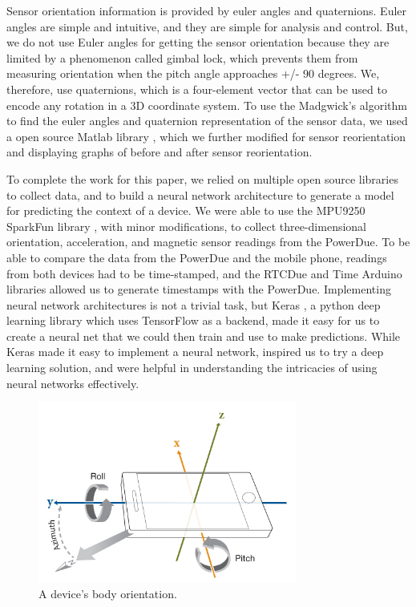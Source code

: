 \documentclass[journal]{IEEEtranTIE}
\begin{document}
Sensor orientation information is provided by euler angles and quaternions. Euler angles are 
simple and intuitive, and they are simple for analysis and control. But, we do not use Euler 
angles for getting the sensor orientation because they are limited by a phenomenon called 
gimbal lock, which prevents them from measuring orientation when the pitch angle approaches
+/- 90 degrees. We, therefore, use quaternions, which is a four-element vector that can be 
used to encode any rotation in a 3D coordinate system. To use the Madgwick's algorithm 
to find the euler angles and quaternion representation of the sensor data, we used a open 
source Matlab library \cite{MadgwickCode}, which we further modified for sensor reorientation
and displaying graphs of before and after sensor reorientation.

To complete the work for this paper, we relied on multiple open source libraries
to collect data, and to build a neural network architecture to generate a model
for predicting the context of a device. We were able to use the MPU9250 SparkFun
library \cite{MPU9250}, with minor modifications, to collect three-dimensional
orientation, acceleration, and magnetic sensor readings from the PowerDue. To be
able to compare the data from the PowerDue and the mobile phone, readings from
both devices had to be time-stamped, and the RTCDue \cite{RTCDue} and Time
\cite{TimeLib} Arduino libraries allowed us to generate timestamps with the
PowerDue. Implementing neural network architectures is not a trivial task, but
Keras \cite{Keras}, a python deep learning library which uses TensorFlow as a
backend, made it easy for us to create a neural net that we could then train and
use to make predictions. While Keras made it easy to implement a neural network,
\cite{LeCunn,DeepLearning} inspired us to try a deep learning solution, and
\cite{DeepLearning,Dropout} were helpful in understanding the intricacies of
using neural networks effectively.


\begin{figure}[!t]\centering
	\includegraphics[width=8.5cm]{phoneOrientation}
	\caption{A device's body orientation.}\label{fig:fig1}
\end{figure}
\end{document}

